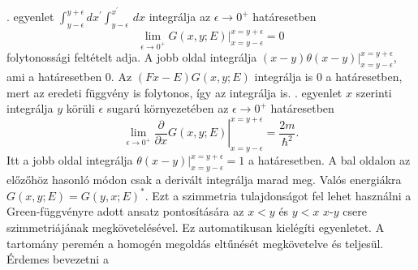 . egyenlet $\int_{y-\epsilon}^{y+\epsilon}dx^\prime \int_{y-\epsilon}^{x^\prime} \,dx$ integrálja az $\epsilon \to 0^+$ határesetben
\begin{equation}
	\lim_{\epsilon \to 0^+}\left.G\left(x,y;E \right)\right\rvert_{x = y - \epsilon}^{x = y + \epsilon} = 0
	\label{green:continuity}
\end{equation}
folytonossági feltételt adja. A jobb oldal integrálja $\left. \left(x - y\right) \theta\left(x - y\right) \right\rvert_{x=y-\epsilon}^{x=y+\epsilon}$, ami a határesetben $0$. Az $\left(Fx - E\right)G\left(x,y;E\right)$ integrálja is $0$ a határesetben, mert az eredeti függvény is folytonos, így az integrálja is. . egyenlet $x$ szerinti integrálja $y$ körüli $\epsilon$ sugarú környezetében az $\epsilon \to 0^+$ határesetben
\begin{equation}
	\lim_{\epsilon \to 0^+}\left.\frac{\partial}{\partial x}G\left(x,y;E \right)\right\rvert_{x = y - \epsilon}^{x = y + \epsilon} = \frac{2m}{\hbar^2}.
\end{equation}
Itt a jobb oldal integrálja $\left. \theta\left(x - y\right) \right\rvert_{x = y - \epsilon}^{x = y + \epsilon} = 1$ a határesetben. A bal oldalon az előzőhöz hasonló módon csak a derivált integrálja marad meg.
Valós energiákra $G(x,y;E)=G(y,x;E)^*$. Ezt a szimmetria tulajdonságot fel lehet használni a Green-függvényre adott ansatz pontosítására az $x<y$ és $y<x$ $x$-$y$ csere szimmetriájának megkövetelésével. Ez automatikusan kielégíti  egyenletet. A tartomány peremén a homogén megoldás eltűnését megkövetelve  és  teljesül. Érdemes bevezetni a
